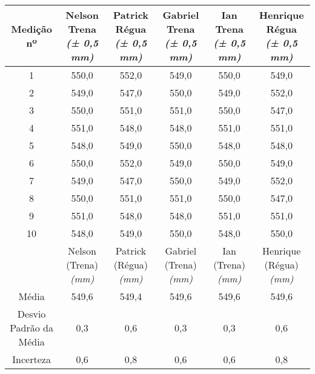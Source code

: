 \documentclass{article}
\begin{document}
\begin{table}[h!]
\centering
\begin{tabular}{c c c c c c }
\toprule
Medição nº & \shortstack{Nelson\\Trena\\\textit{(± 0,5 mm)}} & \shortstack{Patrick\\Régua\\\textit{(± 0,5 mm)}} & \shortstack{Gabriel\\Trena\\\textit{(± 0,5 mm)}} & \shortstack{Ian\\Trena\\\textit{(± 0,5 mm)}} & \shortstack{Henrique\\Régua\\\textit{(± 0,5 mm)}}\\
\midrule
1 & 550,0 & 552,0 & 549,0 & 550,0 & 549,0\\
2 & 549,0 & 547,0 & 550,0 & 549,0 & 552,0\\
3 & 550,0 & 551,0 & 551,0 & 550,0 & 547,0\\
4 & 551,0 & 548,0 & 548,0 & 551,0 & 551,0\\
5 & 548,0 & 549,0 & 550,0 & 548,0 & 548,0\\
6 & 550,0 & 552,0 & 549,0 & 550,0 & 549,0\\
7 & 549,0 & 547,0 & 550,0 & 549,0 & 552,0\\
8 & 550,0 & 551,0 & 551,0 & 550,0 & 547,0\\
9 & 551,0 & 548,0 & 548,0 & 551,0 & 551,0\\
10 & 548,0 & 549,0 & 550,0 & 548,0 & 550,0\\
\midrule
&\shortstack{Nelson\\(Trena)\\\textit{(mm)}} & \shortstack{Patrick\\(Régua)\\\textit{(mm)}} & \shortstack{Gabriel\\(Trena)\\\textit{(mm)}} & \shortstack{Ian\\(Trena)\\\textit{(mm)}} & \shortstack{Henrique\\(Régua)\\\textit{(mm)}}\\
\midrule
Média & 549,6 & 549,4 & 549,6 & 549,6 & 549,6\\[3pt]
\shortstack{Desvio\\Padrão da\\Média} & 0,3 & 0,6 & 0,3 & 0,3 & 0,6\\[3pt]
Incerteza & 0,6 & 0,8 & 0,6 & 0,6 & 0,8\\
\bottomrule
\end{tabular}
\end{table}
\end{document}
